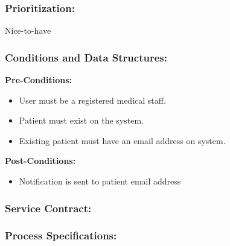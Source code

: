 \documentclass[a4paper,12pt,titlepage]{article}
\begin{document}
\subsubsection{Prioritization:}
Nice-to-have
\subsubsection{Conditions and Data Structures:}
\textbf{Pre-Conditions:}
\begin{itemize}
	\item User must be a registered medical staff.
	\item Patient must exist on the system.
	\item Existing patient must have an email address on system.
\end{itemize}

\textbf{Post-Conditions:}	
\begin{itemize}
	\item Notification is sent to patient email address
\end{itemize}
\subsubsection{Service Contract:} 
\subsubsection{Process Specifications:} 
\end{document}
